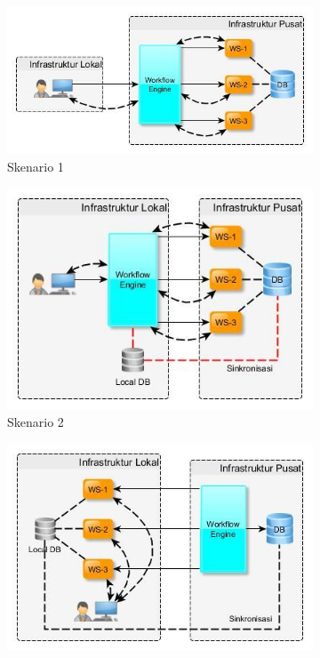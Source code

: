 \begin{figure}[h]
    \begin{subfigure}[b]{.5\textwidth}
  		\centering
  		\includegraphics[width=1\linewidth]{../../Resources/Images/takdir-design-1}
  		\caption{Skenario 1}
  		\label{fig:design-workflow-webservice-1}
	\end{subfigure}%
	\begin{subfigure}[b]{.5\textwidth}
  		\centering
  		\includegraphics[width=1\linewidth]{../../Resources/Images/takdir-design-2}
  		\caption{Skenario 2}
  		\label{fig:design-workflow-webservice-2}
	\end{subfigure}
	\begin{subfigure}[b]{.5\textwidth}
  		\centering
  		\includegraphics[width=1\linewidth]{../../Resources/Images/takdir-design-3}

\end{subfigure}
\end{figure}

